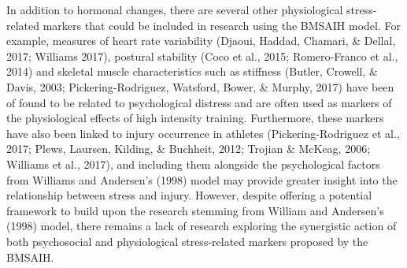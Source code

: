 \documentclass[
  english,
  man,floatsintext]{apa6}
\begin{document}
In addition to hormonal changes, there are several other physiological stress-related markers that could be included in research using the BMSAIH model.
For example, measures of heart rate variability (Djaoui, Haddad, Chamari, \& Dellal, 2017; Williams 2017),
postural stability (Coco et al., 2015; Romero-Franco et al., 2014) and skeletal muscle characteristics such as stiffness (Butler, Crowell, \& Davis, 2003; Pickering-Rodriguez, Watsford, Bower, \& Murphy, 2017) have been of found to be related to psychological distress and are often used as markers of the physiological effects of high intensity training.
Furthermore, these markers have also been linked to injury occurrence in athletes (Pickering-Rodriguez et al., 2017; Plews, Laursen, Kilding, \& Buchheit, 2012; Trojian \& McKeag, 2006; Williams et al., 2017), and including them alongside the psychological factors from Williams and Andersen's (1998) model may provide greater insight into the relationship between stress and injury.
However, despite offering a potential framework to build upon the research stemming from William and Andersen's (1998) model, there remains a lack of research exploring the synergistic action of both psychosocial and physiological stress-related markers proposed by the BMSAIH.
\end{document}
